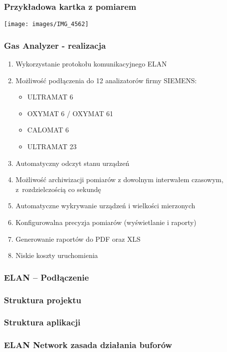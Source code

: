 \documentclass[ucs]{beamer}
\begin{document}
\begin{frame}
\frametitle{Przykładowa kartka z pomiarem}
\begin{center}
\texttt{[image: images/IMG\_4562]}
\end{center}
\end{frame}

\begin{frame}
\frametitle{Gas Analyzer - realizacja}
\begin{enumerate}
\item Wykorzystanie protokołu komunikacyjnego ELAN
\item Możliwość podłączenia do 12 analizatorów firmy SIEMENS:
\begin{itemize}
\item ULTRAMAT 6
\item OXYMAT 6 / OXYMAT 61
\item CALOMAT 6
\item ULTRAMAT 23
\end{itemize}
\item Automatyczny odczyt stanu urządzeń
\item Możliwość archiwizacji pomiarów z dowolnym interwałem czasowym, z~rozdzielczością co sekundę
\item Automatyczne wykrywanie urządzeń i wielkości mierzonych
\item Konfigurowalna precyzja pomiarów (wyświetlanie i raporty)
\item Generowanie raportów do PDF oraz XLS
\item Niskie koszty uruchomienia
\end{enumerate}
\end{frame}

\begin{frame}
\frametitle{ELAN -- Podłączenie}

\end{frame}

\begin{frame}
\frametitle{Struktura projektu}

\end{frame}

\begin{frame}
\frametitle{Struktura aplikacji}
\begin{center}

\end{center}
\end{frame}

\begin{frame}
\frametitle{ELAN Network zasada działania buforów}

\end{frame}
\end{document}
